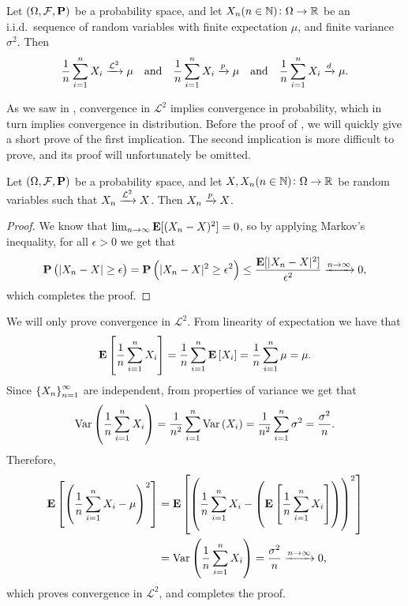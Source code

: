 \documentclass[11pt,a4paper]{article}
\begin{document}
\begin{theorem}
  \label{thm:weak-law-of-large-numbers-second-moments}
  Let $(\Omega, \mathcal F, \mathbf{P})$ be a probability space,
  and let $X_n(n \in \mathbb{N}) \colon \Omega \to \mathbb{R}$ be an i.i.d.\ sequence of random
  variables with finite expectation $\mu$,
  and finite variance $\sigma^2$.
  Then
  \[
    \frac{1}{n} \sum_{i=1}^{n} X_i \xrightarrow{\mathcal L^2} \mu \quad \text{and} \quad
    \frac{1}{n} \sum_{i=1}^{n} X_i \xrightarrow{p} \mu \quad \text{and} \quad
    \frac{1}{n} \sum_{i=1}^{n} X_i \xrightarrow{d} \mu.
  \]
\end{theorem}
\begin{remark}
  As we saw in ,
  convergence in $\mathcal L^2$ implies convergence in probability,
  which in turn implies convergence in distribution.
  Before the proof of ,
  we will quickly give a short prove of the first implication.
  The second implication is more difficult to prove,
  and its proof will unfortunately be omitted.
\end{remark}

\begin{proposition}
  Let $(\Omega, \mathcal F, \mathbf{P})$ be a probability space,
  and let $X,X_n(n \in \mathbb{N}) \colon \Omega \to \mathbb{R}$ be random variables
  such that $X_n \xrightarrow{\mathcal L^2} X$.
  Then $X_n \xrightarrow{p} X$.
\end{proposition}
\begin{proof}
  We know that $\lim_{n \to \infty} \mathbf{E}[(X_n - X)^2] = 0$,
  so by applying Markov's inequality,
  for all $\epsilon > 0$ we get that
  \[
    \mathbf{P}\left(|X_n - X| \geq \epsilon \right) =
    \mathbf{P}\left(|X_n - X|^2 \geq \epsilon^2 \right) \le
    \frac{\mathbf{E}[|X_n - X|^2]}{\epsilon^2} \xrightarrow{n \to \infty} 0,
  \]
  which completes the proof.
\end{proof}

\begin{proofof}{}
  We will only prove convergence in $\mathcal L^2$.
  From linearity of expectation we have that
  \[
    \mathbf{E}\left[\frac{1}{n} \sum_{i=1}^{n} X_i\right] =
    \frac{1}{n} \sum_{i=1}^{n} \mathbf{E}\left[X_i\right] =
    \frac{1}{n} \sum_{i=1}^{n} \mu =
    \mu.
  \]
  Since $\left\{X_n\right\}_{n=1}^{\infty}$ are independent,
  from properties of variance we get that
  \[
    \Var\del{\frac{1}{n} \sum_{i=1}^{n} X_i} =
    \frac{1}{n^2} \sum_{i=1}^{n} \Var\del{X_i} =
    \frac{1}{n^2} \sum_{i=1}^{n} \sigma^2 =
    \frac{\sigma^2}{n}.
  \]
  Therefore,
  \begin{align*}
    \E\left[\del{\frac{1}{n} \sum_{i=1}^{n} X_i - \mu}^2\right] &=
    \E\left[\del{\frac{1}{n} \sum_{i=1}^{n} X_i -
      \del{\E\left[\frac{1}{n} \sum_{i=1}^{n} X_i\right]}}^2\right] \\ &=
    \Var\del{\frac{1}{n} \sum_{i=1}^{n} X_i} =
    \frac{\sigma^2}{n} \taking{n \to \infty} 0,
  \end{align*}
  which proves convergence in $\mathcal L^2$,
  and completes the proof.
\end{proofof}
\end{document}
